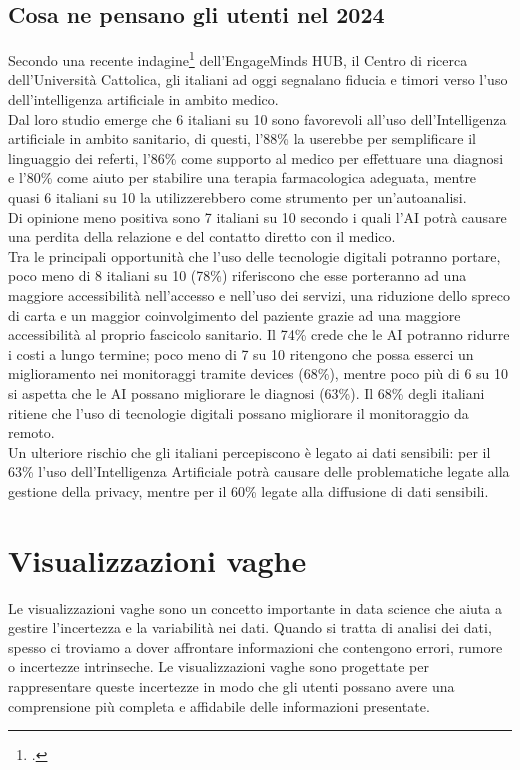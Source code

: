 \subsection{Cosa ne pensano gli utenti nel 2024}
Secondo una recente indagine\footcite{womak:intelligenza-artificiale-e-medicina} dell'EngageMinds HUB, il Centro di ricerca dell'Università Cattolica, gli italiani ad oggi segnalano fiducia e timori verso l'uso dell'intelligenza artificiale in ambito medico.\\
Dal loro studio emerge che 6 italiani su 10 sono favorevoli all'uso dell'Intelligenza artificiale in ambito sanitario, di questi, l'88\% la userebbe per semplificare il linguaggio dei referti, l'86\% come supporto al medico per effettuare una diagnosi e l'80\% come aiuto per stabilire una terapia farmacologica adeguata, mentre quasi 6 italiani su 10 la utilizzerebbero come strumento per un'autoanalisi.\\
Di opinione meno positiva sono 7 italiani su 10 secondo i quali l'AI potrà causare una perdita della relazione e del contatto diretto con il medico.\\

Tra le principali opportunità che l'uso delle tecnologie digitali potranno portare, poco meno di 8 italiani su 10 (78\%) riferiscono che esse porteranno ad una maggiore accessibilità nell'accesso e nell'uso dei servizi, una riduzione dello spreco di carta e un maggior coinvolgimento del paziente grazie ad una maggiore accessibilità al proprio fascicolo sanitario. Il 74\% crede che le AI potranno ridurre i costi a lungo termine; poco meno di 7 su 10 ritengono che possa esserci un miglioramento nei monitoraggi tramite devices (68\%), mentre poco più di 6 su 10 si aspetta che le AI possano migliorare le diagnosi (63\%). Il 68\% degli italiani ritiene che l'uso di tecnologie digitali possano migliorare il monitoraggio da
remoto.\\

Un ulteriore rischio che gli italiani percepiscono è legato ai dati sensibili: per il 63\% l'uso dell'Intelligenza Artificiale potrà causare delle problematiche legate alla gestione della privacy, mentre per il 60\% legate alla diffusione di dati sensibili.


\section{Visualizzazioni vaghe}
\label{sec:visualizzazione-vaghe}
Le visualizzazioni vaghe sono un concetto importante in data science che aiuta a gestire l'incertezza e la variabilità nei dati. Quando si tratta di analisi dei dati, spesso ci troviamo a dover affrontare informazioni che contengono errori, rumore o incertezze intrinseche. Le visualizzazioni vaghe sono progettate per rappresentare queste incertezze in modo che gli utenti possano avere una comprensione più completa e affidabile delle informazioni presentate.\\

